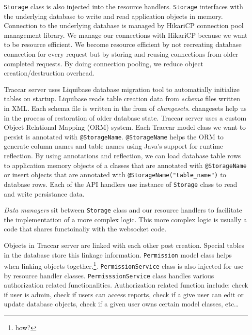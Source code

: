 \documentclass[a4paper]{article}
\begin{document}
\lstinline{Storage}  class is also injected into the resource handlers. \lstinline{Storage} interfaces with the underlying database 
to write and read application objects in memory. Connection to the underlying database is managed by HikariCP connection pool 
management library. We manage our connections with HikariCP because we want to be resource efficient. We become resource efficient by not 
recreating database connection for every request but by storing and reusing connections from older completed requests. By doing 
connection pooling, we reduce object creation/destruction overhead. 

Traccar server uses Liquibase database migration tool to automatially initialize tables on startup. Liquibase reads table creation 
data from \emph{schema} files written in XML. Each schema file is written in the from of \emph{changesets}. changesets help us in 
the process of restoration of older database state. Traccar server uses a custom Object Relational Mapping (ORM) system. 
Each Traccar model class we want to persist is annotated with \lstinline{@StorageName}. \lstinline{@StorageName} helps the ORM to 
generate column names and table names using Java's support for runtime reflection. By using annotations and reflection, we can load 
database table rows to application memory objects of a classes that are annotated with \lstinline{@StorageName} or insert objects that 
are annotated with \lstinline{@StorageName("table_name")} to database rows. Each of the API handlers use instance of  
\lstinline{Storage} class to read and write persistance data. 

\emph{Data managers} sit between \lstinline{Storage} class and our resource handlers to facilitate the 
implementation of a more complex logic. This more complex logic is usually a code that shares functoinaliy with the websocket code. 


Objects in Traccar server are linked with each other post creation. Special tables in the database store this linkage information. 
\lstinline{Permission} model class helps when linking objects together.\footnote{how?}. \lstinline{PermissionService} class is also injected 
for use by resource handler classes. \lstinline{PermisssionService} class handles various authorization related functionalities. 
Authorization related function include: check if user is admin, check if users can access reports, check if a give user can edit or 
update database objects, check if a given user owns certain model classes, etc\ldots
\end{document}
